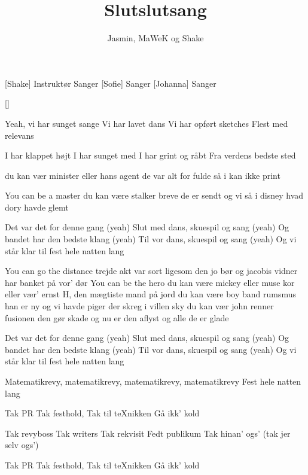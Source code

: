 \documentclass[a4paper,11pt]{article}
\title{Slutslutsang}
\author{Jasmin, MaWeK og Shake}
\begin{document}
\maketitle

\begin{roles}
[Shake] Instruktør
 Sanger
[Sofie] Sanger
[Johanna] Sanger
\end{roles}

\begin{props}
[]
\end{props}

\begin{song}
 Yeah, vi har sunget sange
Vi har lavet dans
Vi har opført sketches
Flest med relevans

 I har klappet højt
I har sunget med
I har grint og råbt
Fra verdens bedste sted

du kan vær minister
eller hans agent
de var alt for fulde så i kan  ikke print

 You can be a master
du kan være stalker
breve de er sendt
og vi så i disney hvad dory havde glemt


 Det var det for denne gang (yeah)
Slut med dans, skuespil og sang (yeah)
Og bandet har den bedste klang (yeah)
Til vor dans, skuespil og sang (yeah)
Og vi står klar til fest hele natten lang

 You can go the distance
trejde akt var sort ligesom den jo bør 
og jacobis vidner har banket på vor' dør
 You can be the hero
du kan være mickey	
eller  muse kor
eller vær’ ernst H, den mægtiste mand på jord
du kan være boy band
rumsmus han er ny 
og vi havde piger der skreg i villen sky
du kan vær john renner
fusionen den gør skade
og nu er den aflyst og alle de er glade

 Det var det for denne gang (yeah)
Slut med dans, skuespil og sang (yeah)
Og bandet har den bedste klang (yeah)
Til vor dans, skuespil og sang (yeah)
Og vi står klar til fest hele natten lang

 Matematikrevy, matematikrevy, matematikrevy, matematikrevy
 Fest hele natten lang

 Tak PR
Tak festhold,
Tak til teXnikken
Gå ikk’ kold

Tak revyboss
Tak writers
Tak rekvisit
Fedt publikum
Tak hinan’ ogs’ (tak jer selv ogs’)

Tak PR
Tak festhold,
Tak til teXnikken
Gå ikk’ kold


\end{song}
\end{document}
